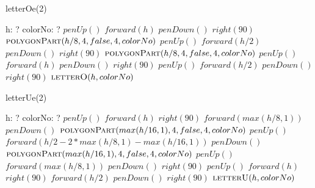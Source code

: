 \documentclass[a4paper,10pt]{article}
\begin{document}
\begin{algorithm}
\caption{letterOe(2)}
\begin{algorithmic}[5]
\State {}
\State {}
    \State h: ?
    \State colorNo: ?
  \EndDecl
  \State \(penUp()\)
  \State \(forward(h)\)
  \State \(penDown()\)
  \State \(right(90)\)
  \State {}
  \State {}
  \State \(\Call{polygonPart}{h/8,4,false,4,colorNo}\)
  \State \(penUp()\)
  \State \(forward(h/2)\)
  \State \(penDown()\)
  \State \(right(90)\)
  \State {}
  \State {}
  \State \(\Call{polygonPart}{h/8,4,false,4,colorNo}\)
  \State \(penUp()\)
  \State \(forward(h)\)
  \State \(penDown()\)
  \State \(right(90)\)
  \State \(penUp()\)
  \State \(forward(h/2)\)
  \State \(penDown()\)
  \State \(right(90)\)
  \State \(\Call{letterO}{h,colorNo}\)
\EndProcedure
\end{algorithmic}
\end{algorithm}


\begin{algorithm}
\caption{letterUe(2)}
\begin{algorithmic}[5]
\State {}
\State {}
    \State h: ?
    \State colorNo: ?
  \EndDecl
  \State \(penUp()\)
  \State \(forward(h)\)
  \State \(right(90)\)
  \State \(forward(max(h/8,1))\)
  \State \(penDown()\)
  \State {}
  \State {}
  \State \(\Call{polygonPart}{max(h/16,1),4,false,4,colorNo}\)
  \State \(penUp()\)
  \State \(forward(h/2-2*max(h/8,1)-max(h/16,1))\)
  \State \(penDown()\)
  \State {}
  \State {}
  \State \(\Call{polygonPart}{max(h/16,1),4,false,4,colorNo}\)
  \State \(penUp()\)
  \State \(forward(max(h/8,1))\)
  \State \(penDown()\)
  \State \(right(90)\)
  \State \(penUp()\)
  \State \(forward(h)\)
  \State \(right(90)\)
  \State \(forward(h/2)\)
  \State \(penDown()\)
  \State \(right(90)\)
  \State \(\Call{letterU}{h,colorNo}\)
\EndProcedure
\end{algorithmic}
\end{algorithm}
\end{document}
